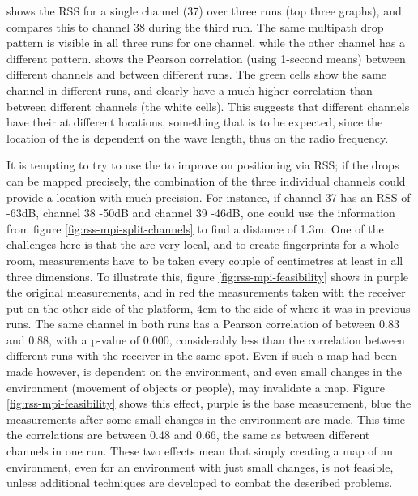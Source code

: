  shows the RSS for a single channel (37) over three runs (top three graphs), and compares this to channel 38 during the third run.
The same multipath drop pattern is visible in all three runs for one channel, while the other channel has a different pattern.
 shows the Pearson correlation (using 1-second means) between different channels and between different runs.
The green cells show the same channel in different runs, and clearly have a much higher correlation than between different channels (the white cells).
This suggests that different channels have their \mpids at different locations, something that is to be expected, since the location of the \mpids is dependent on the wave length, thus on the radio frequency.


It is tempting to try to use the \mpids to improve on positioning via RSS; if the drops can be mapped precisely, the combination of the three individual channels could provide a location with much precision.
For instance, if channel 37 has an RSS of -63dB, channel 38 -50dB and channel 39 -46dB, one could use the information from figure \ref{fig:rss-mpi-split-channels} to find a distance of 1.3m.
One of the challenges here is that the \mpids are very local, and to create fingerprints for a whole room, measurements have to be taken every couple of centimetres at least in all three dimensions.
To illustrate this, figure \ref{fig:rss-mpi-feasibility} shows in purple the original measurements, and in red the measurements taken with the receiver put on the other side of the platform, 4cm to the side of where it was in previous runs.
The same channel in both runs has a Pearson correlation of between 0.83 and 0.88, with a p-value of 0.000, considerably less than the correlation between different runs with the receiver in the same spot.
Even if such a map had been made however, \mpi is dependent on the environment, and even small changes in the environment (movement of objects or people), may invalidate a map.
Figure \ref{fig:rss-mpi-feasibility} shows this effect, purple is the base measurement, blue the measurements after some small changes in the environment are made.
This time the correlations are between 0.48 and 0.66, the same as between different channels in one run.
These two effects mean that simply creating a map of an environment, even for an environment with just small changes, is not feasible, unless additional techniques are developed to combat the described problems.

